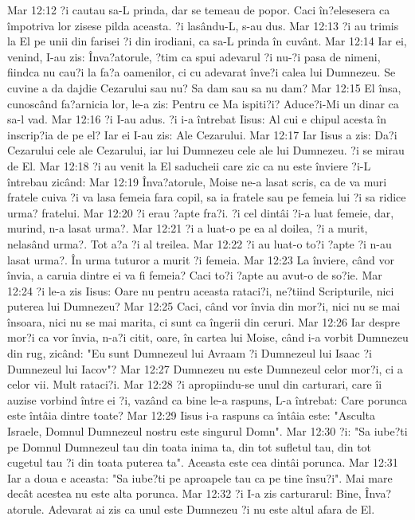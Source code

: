 Mar 12:12  ?i cautau sa-L prinda, dar se temeau de popor. Caci în?elesesera ca împotriva lor zisese pilda aceasta. ?i lasându-L, s-au dus.
Mar 12:13  ?i au trimis la El pe unii din farisei ?i din irodiani, ca sa-L prinda în cuvânt.
Mar 12:14  Iar ei, venind, I-au zis: Înva?atorule, ?tim ca spui adevarul ?i nu-?i pasa de nimeni, fiindca nu cau?i la fa?a oamenilor, ci cu adevarat înve?i calea lui Dumnezeu. Se cuvine a da dajdie Cezarului sau nu? Sa dam sau sa nu dam?
Mar 12:15  El însa, cunoscând fa?arnicia lor, le-a zis: Pentru ce Ma ispiti?i? Aduce?i-Mi un dinar ca sa-l vad.
Mar 12:16  ?i I-au adus. ?i i-a întrebat Iisus: Al cui e chipul acesta în inscrip?ia de pe el? Iar ei I-au zis: Ale Cezarului.
Mar 12:17  Iar Iisus a zis: Da?i Cezarului cele ale Cezarului, iar lui Dumnezeu cele ale lui Dumnezeu. ?i se mirau de El.
Mar 12:18  ?i au venit la El saducheii care zic ca nu este înviere ?i-L întrebau zicând:
Mar 12:19  Înva?atorule, Moise ne-a lasat scris, ca de va muri fratele cuiva ?i va lasa femeia fara copil, sa ia fratele sau pe femeia lui ?i sa ridice urma? fratelui.
Mar 12:20  ?i erau ?apte fra?i. ?i cel dintâi ?i-a luat femeie, dar, murind, n-a lasat urma?.
Mar 12:21  ?i a luat-o pe ea al doilea, ?i a murit, nelasând urma?. Tot a?a ?i al treilea.
Mar 12:22  ?i au luat-o to?i ?apte ?i n-au lasat urma?. În urma tuturor a murit ?i femeia.
Mar 12:23  La înviere, când vor învia, a caruia dintre ei va fi femeia? Caci to?i ?apte au avut-o de so?ie.
Mar 12:24  ?i le-a zis Iisus: Oare nu pentru aceasta rataci?i, ne?tiind Scripturile, nici puterea lui Dumnezeu?
Mar 12:25  Caci, când vor învia din mor?i, nici nu se mai însoara, nici nu se mai marita, ci sunt ca îngerii din ceruri.
Mar 12:26  Iar despre mor?i ca vor învia, n-a?i citit, oare, în cartea lui Moise, când i-a vorbit Dumnezeu din rug, zicând: "Eu sunt Dumnezeul lui Avraam ?i Dumnezeul lui Isaac ?i Dumnezeul lui Iacov"?
Mar 12:27  Dumnezeu nu este Dumnezeul celor mor?i, ci a celor vii. Mult rataci?i.
Mar 12:28  ?i apropiindu-se unul din carturari, care îi auzise vorbind între ei ?i, vazând ca bine le-a raspuns, L-a întrebat: Care porunca este întâia dintre toate?
Mar 12:29  Iisus i-a raspuns ca întâia este: "Asculta Israele, Domnul Dumnezeul nostru este singurul Domn".
Mar 12:30  ?i: "Sa iube?ti pe Domnul Dumnezeul tau din toata inima ta, din tot sufletul tau, din tot cugetul tau ?i din toata puterea ta". Aceasta este cea dintâi porunca.
Mar 12:31  Iar a doua e aceasta: "Sa iube?ti pe aproapele tau ca pe tine însu?i". Mai mare decât acestea nu este alta porunca.
Mar 12:32  ?i I-a zis carturarul: Bine, Înva?atorule. Adevarat ai zis ca unul este Dumnezeu ?i nu este altul afara de El.

